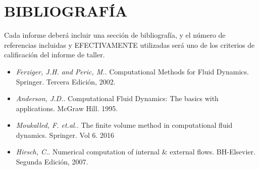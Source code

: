 \documentclass[11pt,stdletter,orderfromtodate,sigleft,twoside]{report}
\begin{document}
\lipsum[1-2]

\section{BIBLIOGRAFÍA}
Cada informe deber\'a incluir una secci\'on de bibliograf\'ia, y el n\'umero de
referencias incluidas y EFECTIVAMENTE utilizadas ser\'a uno de los criterios de
calificaci\'on del informe de taller.

\begin{itemize}

\item \textit{Ferziger, J.H. and Peric, M.}. Computational Methods for Fluid Dynamics.
Springer. Tercera Edición, 2002.
\item \textit{Anderson, J.D.}. Computational Fluid Dynamics: The basics with applications.
McGraw Hill. 1995.
\item \textit{Moukalled, F. et.al.}. The finite volume method in computational fluid
dynamics. Springer. Vol 6. 2016
\item \textit{Hirsch, C.}. Numerical computation of internal \& external flows.
BH-Elsevier. Segunda Edición, 2007.

\end{itemize}
\end{document}
